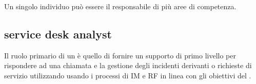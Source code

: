 Un singolo individuo può essere il responsabile di più aree di competenza.

\subsection[Service Desk Analyst]{service desk analyst}
\label{sd-sd-analyst}
Il ruolo primario di un  è quello di fornire un supporto di primo livello per rispondere ad una chiamata e la gestione degli incidenti derivanti o richieste di servizio utilizzando usando i processi di \acf{IM} e \acf{RF} in linea con gli obiettivi del .